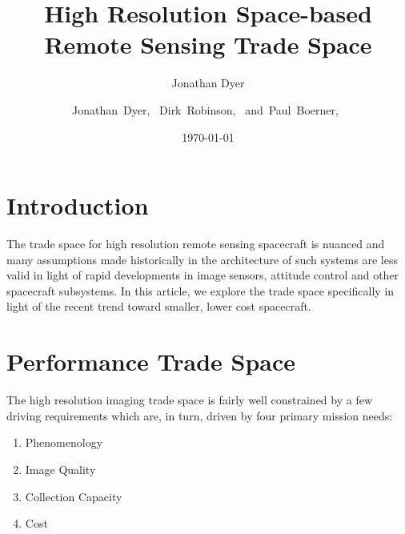 \documentclass[10pt,journal]{IEEEtran}  %
\author{Jonathan Dyer}
\date{\today}
\title{High Resolution Space-based Remote Sensing Trade Space}
\begin{document}
\newtheorem{mydef}{Definition}

\makeatletter
\newcommand\footnoteref[1]{\protected@xdef\@thefnmark{\ref{#1}}\@footnotemark}
\makeatother

\author{Jonathan~Dyer,~
        Dirk~Robinson,~
        and~Paul~Boerner,~%
}

%
{}
        
        


\maketitle

\IEEEdisplaynontitleabstractindextext

\section{Introduction}
\label{sec:introduction}

The trade space for high resolution remote sensing spacecraft is nuanced and many assumptions made historically in the architecture of such systems are less valid in light of rapid developments in image sensors, attitude control and other spacecraft subsystems.  In this article, we explore the trade space specifically in light of the recent trend toward smaller, lower cost spacecraft.

\section{Performance Trade Space}
\label{sec:trade_space}

The high resolution imaging trade space is fairly well constrained by a few driving requirements which are, in turn, driven by four primary mission needs:

\begin{enumerate}
\item Phenomenology
\item Image Quality
\item Collection Capacity
\item Cost
\end{enumerate}
\end{document}

